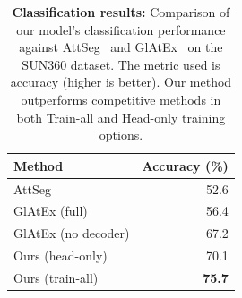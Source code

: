 \begin{table}[t]
\begin{center}
\begin{small}
\begin{sc}
\begin{tabular}{lr}
\toprule
Method & Accuracy (\%) \\
\midrule
AttSeg & 52.6\\
GlAtEx (full) & 56.4\\
GlAtEx (no decoder) & 67.2\\
Ours (head-only) & 70.1\\
Ours (train-all) & \textbf{75.7}\\
\bottomrule
\end{tabular}
\end{sc}
\end{small}
\end{center}
\vskip -0.1in
\caption{\textbf{Classification results:} Comparison of our model's classification performance against AttSeg~\protect\cite{seifi2020segment} and GlAtEx~\protect\cite{seifi2021glimpse} on the SUN360 dataset. The metric used is accuracy (higher is better). Our method outperforms competitive methods in both Train-all and Head-only training options.}
\label{tab:classification}
\end{table}